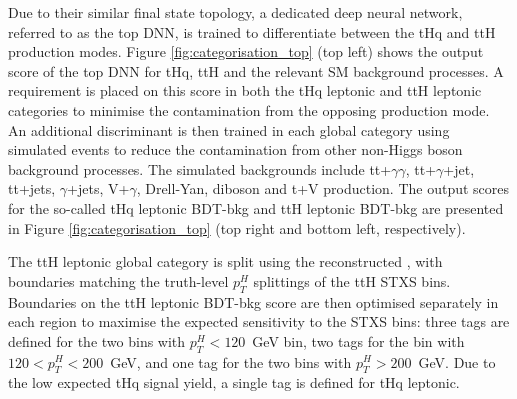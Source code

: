 Due to their similar final state topology, a dedicated deep neural network, referred to as the top DNN, is trained to differentiate between the tHq and ttH production modes. Figure \ref{fig:categorisation_top} (top left) shows the output score of the top DNN for tHq, ttH and the relevant SM background processes. A requirement is placed on this score in both the tHq leptonic and ttH leptonic categories to minimise the contamination from the opposing production mode. An additional discriminant is then trained in each global category using simulated events to reduce the contamination from other non-Higgs boson background processes. The simulated backgrounds include tt+$\gamma\gamma$, tt+$\gamma$+jet, tt+jets, $\gamma$+jets, V+$\gamma$, Drell-Yan, diboson and t+V production. The output scores for the so-called tHq leptonic BDT-bkg and ttH leptonic BDT-bkg are presented in Figure \ref{fig:categorisation_top} (top right and bottom left, respectively). 

The ttH leptonic global category is split using the reconstructed \ptgg, with boundaries matching the truth-level $p_T^H$ splittings of the ttH STXS bins. Boundaries on the ttH leptonic BDT-bkg score are then optimised separately in each region to maximise the expected sensitivity to the STXS bins: three tags are defined for the two bins with $p_T^H<120$~GeV bin, two tags for the bin with $120<p_T^H<200$~GeV, and one tag for the two bins with $p_T^H>200$~GeV. Due to the low expected tHq signal yield, a single tag is defined for tHq leptonic.

